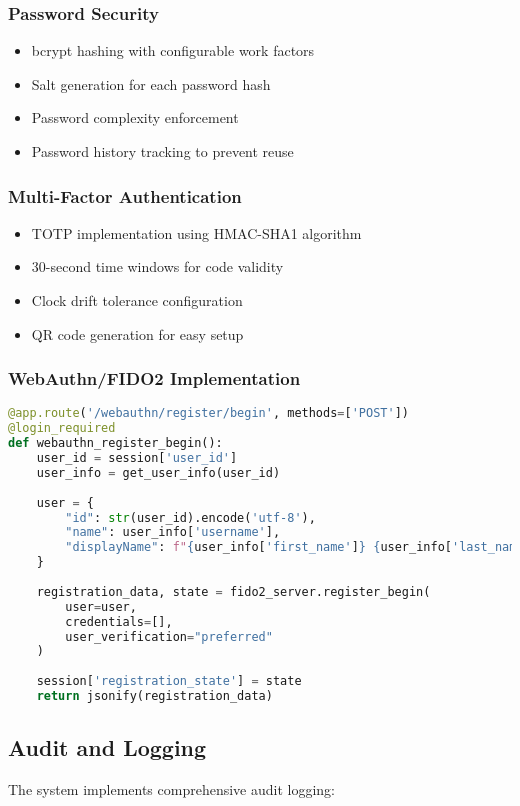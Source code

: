 \documentclass[12pt,a4paper]{article}
\begin{document}
\subsubsection{Password Security}
\begin{itemize}
    \item bcrypt hashing with configurable work factors
    \item Salt generation for each password hash
    \item Password complexity enforcement
    \item Password history tracking to prevent reuse
\end{itemize}

\subsubsection{Multi-Factor Authentication}
\begin{itemize}
    \item TOTP implementation using HMAC-SHA1 algorithm
    \item 30-second time windows for code validity
    \item Clock drift tolerance configuration
    \item QR code generation for easy setup
\end{itemize}

\subsubsection{WebAuthn/FIDO2 Implementation}
\begin{lstlisting}[language=Python, caption=WebAuthn Registration Process]
@app.route('/webauthn/register/begin', methods=['POST'])
@login_required
def webauthn_register_begin():
    user_id = session['user_id']
    user_info = get_user_info(user_id)
    
    user = {
        "id": str(user_id).encode('utf-8'),
        "name": user_info['username'],
        "displayName": f"{user_info['first_name']} {user_info['last_name']}"
    }
    
    registration_data, state = fido2_server.register_begin(
        user=user,
        credentials=[],
        user_verification="preferred"
    )
    
    session['registration_state'] = state
    return jsonify(registration_data)
\end{lstlisting}

\subsection{Audit and Logging}
The system implements comprehensive audit logging:
\end{document}

